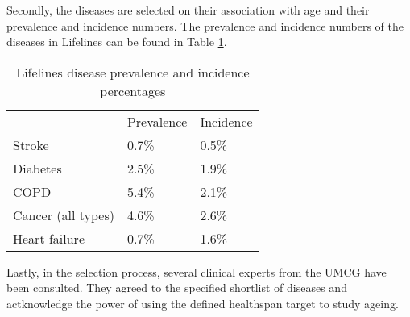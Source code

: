 Secondly, the diseases are selected on their association with age and their prevalence and incidence numbers. The prevalence and incidence numbers of the diseases in Lifelines can be found in Table \ref{table:data:disease_prevalence_incidence}. 
\vspace{0.5cm}
\begin{table} [H]
    \centering
    \caption{Lifelines disease prevalence and incidence percentages}
    \begin{tabular}{lll}
    \cline{1-3}
                       & Prevalence & Incidence \\ \cline{1-3}
    Stroke             & 0.7\%            & 0.5\%                   \\
    Diabetes           & 2.5\%            & 1.9\%             \\
    COPD               & 5.4\%            & 2.1\%              \\
    Cancer (all types) & 4.6\%            & 2.6\%              \\
    Heart failure           & 0.7\%             & 1.6\%    \\  
    \cline{1-3}       
    \end{tabular}
    \label{table:data:disease_prevalence_incidence}
\end{table} 

Lastly, in the selection process, several clinical experts from the UMCG have been consulted. They agreed to the specified shortlist of diseases and actknowledge the power of using the defined healthspan target to study ageing. 

